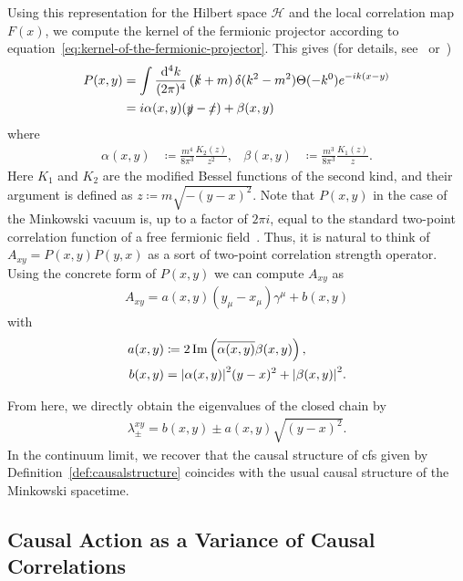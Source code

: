\documentclass[reqno,11pt]{amsart}
\newcommand{\defeq}{\coloneqq}
\renewcommand{\H}{\mathcal{H}}
\numberwithin{equation}{section}
\begin{document}
Using this representation for the Hilbert space $\H$ and the local correlation map $F(x)$, we compute the kernel of the
fermionic projector according to equation~\eqref{eq:kernel-of-the-fermionic-projector}.
This gives (for details, see~\cite[Chapter~1]{cfs} or~\cite[Section~5.6]{Finster2024})
\begin{align}
    \label{eq:p-sea}
    P(x, y) &= \int \frac{\dd^4 k}{(2 \pi)^4} \left(\slashed{k} + m \right) \delta(k^2 - m^2) \Theta(-k^0) e^{-ik(x-y)} \\
    &= i \alpha(x, y) (\slashed{y} - \slashed{x})  + \beta(x, y)
\end{align}
where
\begin{align} \label{eq:alpha-beta}
    \alpha(x, y) &\defeq \frac{m^4}{8 \pi^3} \frac{K_2(z)}{z^2}, & \beta(x, y) &\defeq \frac{m^3}{8 \pi^3} \frac{K_1(z)}{z}.
\end{align}
Here $K_1$ and $K_2$ are the modified Bessel functions of the second kind, and their argument is defined as $z \defeq m \sqrt {-(y - x)^2}$.
Note that $P(x, y)$ in the case of the Minkowski vacuum is, up to a factor of $2 \pi i$, equal to the standard
two-point correlation function of a free fermionic field~\cite[Chapter 3]{Peskin2018}.
Thus, it is natural to think of $A_{xy} = P(x, y) P(y, x)$ as a sort of two-point correlation strength operator.
Using the concrete form of $P(x, y)$ we can compute $A_{xy}$ as
\begin{align}
    A_{xy} = a(x, y) (y_\mu - x_\mu) \gamma^\mu + b(x, y)
\end{align}
with
\begin{align}
    a(x, y) &\defeq 2 \Im \left( \overline{\alpha(x, y)} \beta(x, y) \right), \\
    b(x, y) &= \abs{\alpha(x, y)}^2 (y - x)^2 + \abs{\beta(x, y)}^2.
\end{align}

From here, we directly obtain the eigenvalues of the closed chain by
\begin{align}
    \lambda^{xy}_{\pm} = b(x, y) \pm a(x, y) \sqrt {(y - x)^2}.
\end{align}
In the continuum limit, we recover that the causal structure of \ac{cfs} given by Definition~\ref{def:causalstructure}
coincides with the usual causal structure of the Minkowski spacetime.
% 
\subsection{Causal Action as a Variance of Causal Correlations}\label{subsec:causal-action-as-a-variance-of-correlations}
\end{document}
